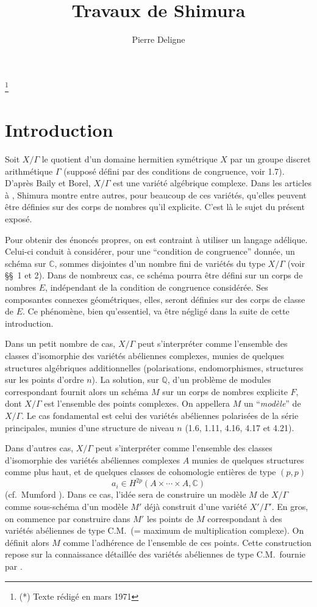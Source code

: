 \documentclass[11pt]{amsart}
\theoremstyle{plain}
\theoremstyle{definition}
\newcommand{\QQ}{\mathbb{Q}}
\newcommand{\CC}{\mathbb{C}}
\begin{document}
\title{Travaux de Shimura}
\author{Pierre Deligne}
\thanks{(*) Texte r\'edig\'e en mars 1971}
\maketitle

\section*{Introduction}

Soit $X/\Gamma$ le quotient d'un domaine hermitien sym\'etrique $X$ par un groupe discret arithm\'etique $\Gamma$ (suppos\'e d\'efini par des conditions de congruence, voir 1.7). D'apr\`es Baily et Borel, $X/\Gamma$ est une vari\'et\'e alg\'ebrique complexe. Dans les articles \cite{Sh1} \`a \cite{Sh5}, Shimura montre entre autres, pour beaucoup de ces vari\'et\'es, qu'elles peuvent \^etre d\'efinies sur des corps de nombres qu'il explicite. C'est l\`a le sujet du pr\'esent expos\'e.

Pour obtenir des \'enonc\'es propres, on est contraint \`a utiliser un langage ad\'elique. Celui-ci conduit \`a consid\'erer, pour une ``condition de congruence'' donn\'ee, un sch\'ema sur $\CC$, sommes disjointes d'un nombre fini de vari\'et\'es du type $X/\Gamma$ (voir \S\S\ 1 et 2). Dans de nombreux cas, ce sch\'ema pourra \^etre d\'efini sur un corps de nombres $E$, ind\'ependant de la condition de congruence consid\'er\'ee. Ses composantes connexes g\'eom\'etriques, elles, seront d\'efinies sur des corps de classe de $E$. Ce ph\'enom\`ene, bien qu'essentiel, va \^etre n\'eglig\'e dans la suite de cette introduction.

Dans un petit nombre de cas, $X/\Gamma$ peut s'interpr\'eter comme l'ensemble des classes d'isomorphie des vari\'et\'es ab\'eliennes complexes, munies de quelques structures alg\'ebriques additionnelles (polarisations, endomorphismes, structures sur les points d'ordre $n$). La solution, sur $\QQ$, d'un probl\`eme de modules correspondant fournit alors un sch\'ema $M$ sur un corps de nombres explicite $F$, dont $X/\Gamma$ est l'ensemble des points complexes. On appellera $M$ un ``\emph{mod\`ele}'' de $X/\Gamma$. Le cas fondamental est celui des vari\'et\'es ab\'eliennes polaris\'ees de la s\'erie principales, munies d'une structure de niveau $n$ (1.6, 1.11, 4.16, 4.17 et 4.21).

Dans d'autres cas, $X/\Gamma$ peut s'interpr\'eter comme l'ensemble des classes d'isomorphie des vari\'et\'es ab\'eliennes complexes $A$ munies de quelques structures comme plus haut, et de quelques classes de cohomologie enti\`eres de type $(p,p)$
\[
a_i \in H^{2p}(A \times \cdots \times A, \CC)
\]
(cf.\ Mumford \cite{Mu1}). Dans ce cas, l'id\'ee sera de construire un mod\`ele $M$ de $X/\Gamma$ comme sous-sch\'ema d'un mod\`ele $M'$ d\'ej\`a construit d'une vari\'et\'e $X'/\Gamma'$. En gros, on commence par construire dans $M'$ les points de $M$ correspondant \`a des vari\'et\'es ab\'eliennes de type C.M.\ (= maximum de multiplication complexe). On d\'efinit alors $M$ comme l'adh\'erence de l'ensemble de ces points. Cette construction repose sur la connaissance d\'etaill\'ee des vari\'et\'es ab\'eliennes de type C.M.\ fournie par \cite{ST}.
\end{document}

